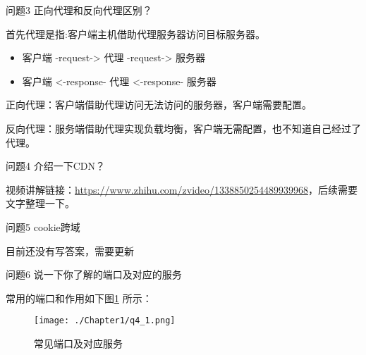 \documentclass[cn,11pt,color=blue,lang=cn]{elegantbook}
\begin{document}
\begin{custom}{问题3}
正向代理和反向代理区别？
\end{custom}
\begin{solution}
首先代理是指:客户端主机借助代理服务器访问目标服务器。
\begin{itemize}
\item 客户端 -request-> 代理 -request-> 服务器
\item 客户端 <-response- 代理 <-response- 服务器
\end{itemize}

正向代理：客户端借助代理访问无法访问的服务器，客户端需要配置。

反向代理：服务端借助代理实现负载均衡，客户端无需配置，也不知道自己经过了代理。
\end{solution}

\begin{custom}{问题4}
介绍一下CDN？
\end{custom}
\begin{solution}
视频讲解链接：\href{https://www.zhihu.com/zvideo/1338850254489939968}{https://www.zhihu.com/zvideo/1338850254489939968}，后续需要文字整理一下。
\end{solution}

\begin{custom}{问题5}
cookie跨域
\end{custom}
\begin{solution}
目前还没有写答案，需要更新
\end{solution}

\begin{custom}{问题6}
说一下你了解的端口及对应的服务
\end{custom}
\begin{solution}
常用的端口和作用如下图\ref{fig4_1} 所示：
\begin{figure}[!t]
\centering
\texttt{[image: ./Chapter1/q4\_1.png]}
\caption{常见端口及对应服务}
\label{fig4_1}
\end{figure}

\end{solution}
\end{document}
